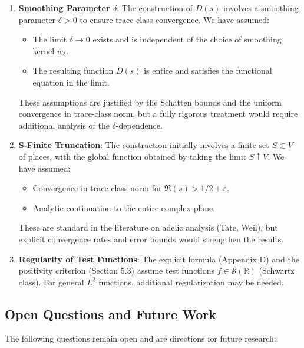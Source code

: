 \begin{enumerate}
\item \textbf{Smoothing Parameter $\delta$}: The construction of $D(s)$ involves a smoothing parameter $\delta > 0$ to ensure trace-class convergence. We have assumed:
\begin{itemize}
\item The limit $\delta \to 0$ exists and is independent of the choice of smoothing kernel $w_\delta$.
\item The resulting function $D(s)$ is entire and satisfies the functional equation in the limit.
\end{itemize}

These assumptions are justified by the Schatten bounds and the uniform convergence in trace-class norm, but a fully rigorous treatment would require additional analysis of the $\delta$-dependence.

\item \textbf{S-Finite Truncation}: The construction initially involves a finite set $S \subset V$ of places, with the global function obtained by taking the limit $S \uparrow V$. We have assumed:
\begin{itemize}
\item Convergence in trace-class norm for $\Re(s) > 1/2 + \varepsilon$.
\item Analytic continuation to the entire complex plane.
\end{itemize}

These are standard in the literature on adelic analysis (Tate, Weil), but explicit convergence rates and error bounds would strengthen the results.

\item \textbf{Regularity of Test Functions}: The explicit formula (Appendix D) and the positivity criterion (Section 5.3) assume test functions $f \in \mathcal{S}(\mathbb{R})$ (Schwartz class). For general $L^2$ functions, additional regularization may be needed.
\end{enumerate}

\subsection{Open Questions and Future Work}

The following questions remain open and are directions for future research:

